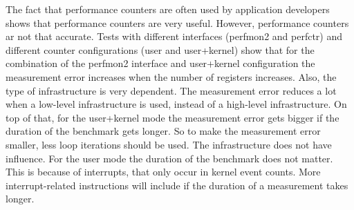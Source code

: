 The fact that performance counters are often used by application developers shows that performance counters are very useful. However, performance counters ar not that accurate. Tests with different interfaces (perfmon2 and perfctr) and different counter configurations (user and user+kernel) show that for the combination of the perfmon2 interface and user+kernel configuration the measurement error increases when the number of registers increases. \cite{AccuracyPerformanceCounter}
Also, the type of infrastructure is very dependent. The measurement error reduces a lot when a low-level infrastructure is used, instead of a high-level infrastructure.
On top of that, for the user+kernel mode the measurement error gets bigger if the duration of the benchmark gets longer. \cite{AccuracyPerformanceCounter} So to make the measurement error smaller, less loop iterations should be used.  The infrastructure does not have influence. For the user mode the duration of the benchmark does not matter. This is because of interrupts, that only occur in kernel event counts. More interrupt-related instructions will include if the duration of a measurement takes longer.

